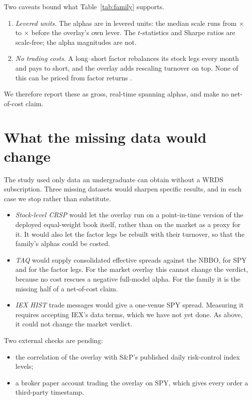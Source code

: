 \documentclass[11pt]{article}
\begin{document}
Two caveats bound what Table~\ref{tab:family} supports.
\begin{enumerate}
\item \emph{Levered units.} The alphas are in levered units: the median
  scale runs from \scaleMin$\times$ to \scaleMax$\times$ before the
  overlay's own lever. The $t$-statistics and Sharpe ratios are scale-free;
  the alpha magnitudes are not.
\item \emph{No trading costs.} A long--short factor rebalances its stock
  legs every month and pays to short, and the overlay adds rescaling
  turnover on top. None of this can be priced from factor returns
  \citep[compare][]{novymarx2016,barroso2021}.
\end{enumerate}
We therefore report these as gross, real-time spanning alphas, and make no
net-of-cost claim.

\section{What the missing data would change}

The study used only data an undergraduate can obtain without a WRDS
subscription. Three missing datasets would sharpen specific results, and in
each case we stop rather than substitute.
\begin{itemize}
\item \emph{Stock-level CRSP} would let the overlay run on a point-in-time
  version of the deployed equal-weight book itself, rather than on the
  market as a proxy for it. It would also let the factor legs be rebuilt
  with their turnover, so that the family's alphas could be costed.
\item \emph{TAQ} would supply consolidated effective spreads against the
  NBBO, for SPY and for the factor legs. For the market overlay this cannot
  change the verdict, because no cost rescues a negative full-model alpha.
  For the family it is the missing half of a net-of-cost claim.
\item \emph{IEX HIST} trade messages would give a one-venue SPY spread.
  Measuring it requires accepting IEX's data terms, which we have not yet
  done. As above, it could not change the market verdict.
\end{itemize}

Two external checks are pending:
\begin{itemize}
\item the correlation of the overlay with S\&P's published daily
  risk-control index levels;
\item a broker paper account trading the overlay on SPY, which gives every
  order a third-party timestamp.
\end{itemize}
\end{document}
